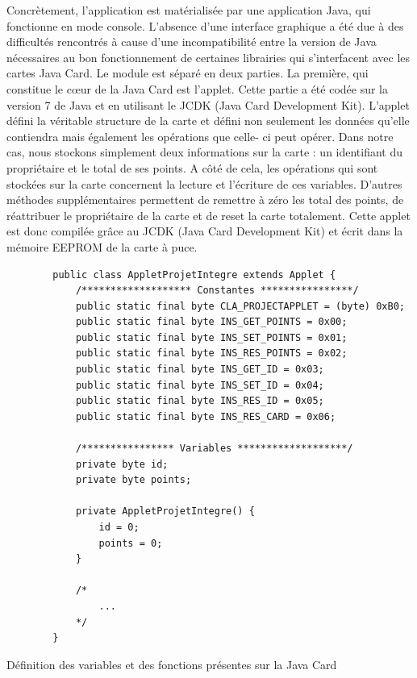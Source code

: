 Concrètement, l'application est matérialisée par une application Java, qui fonctionne en mode console.
L'absence d'une interface graphique a été due à des difficultés rencontrés à cause d'une incompatibilité
entre la version de Java nécessaires au bon fonctionnement de certaines librairies qui s'interfacent
avec les cartes Java Card. Le module est séparé en deux parties.
La première, qui constitue le cœur de la Java Card est l'applet. Cette partie a été codée sur la version
7 de Java et en utilisant le JCDK (Java Card Development Kit). L'applet défini la véritable structure de la
carte et défini non seulement les données qu'elle contiendra mais également les opérations que celle-
ci peut opérer. Dans notre cas, nous stockons simplement deux informations sur la carte : un identifiant
du propriétaire et le total de ses points. A côté de cela, les opérations qui sont stockées sur la carte
concernent la lecture et l'écriture de ces variables. D'autres méthodes supplémentaires permettent de remettre à zéro les total des points, de réattribuer le propriétaire de la carte et de reset la carte
totalement. Cette applet est donc compilée grâce au JCDK (Java Card Development Kit) et écrit dans la
mémoire EEPROM de la carte à puce.

\begin{listing}[H]
    \begin{verbatim}
        public class AppletProjetIntegre extends Applet {
            /******************* Constantes ****************/
            public static final byte CLA_PROJECTAPPLET = (byte) 0xB0;
            public static final byte INS_GET_POINTS = 0x00;
            public static final byte INS_SET_POINTS = 0x01;
            public static final byte INS_RES_POINTS = 0x02;
            public static final byte INS_GET_ID = 0x03;
            public static final byte INS_SET_ID = 0x04;
            public static final byte INS_RES_ID = 0x05;
            public static final byte INS_RES_CARD = 0x06;
        
            /**************** Variables *******************/
            private byte id;
            private byte points;

            private AppletProjetIntegre() {
                id = 0;
                points = 0;
            }

            /*
                ...
            */
        }
    \end{verbatim}
    \caption{Définition des variables et des fonctions présentes sur la Java Card}
    \label{listing:applet-projet-integre}
\end{listing}

